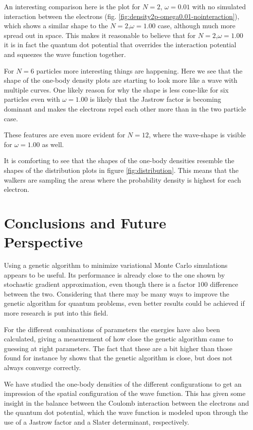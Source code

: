 \documentclass[aps,prb,twocolumn,floatfix]{revtex4}
\begin{document}
An interesting comparison here is the plot for $N=2$, $\omega=0.01$ with no simulated interaction between the electrons (fig. \ref{fig:density2p-omega0.01-nointeraction}), which shows a similar shape to the $N=2$,$\omega=1.00$ case, although much more spread out in space. This makes it reasonable to believe that for $N=2$,$\omega=1.00$ it is in fact the quantum dot potential that overrides the interaction potential and squeezes the wave function together.

For $N=6$ particles more interesting things are happening. Here we see that the shape of the one-body density plots are starting to look more like a wave with multiple curves. One likely reason for why the shape is less cone-like for six particles even with $\omega = 1.00$ is likely that the Jastrow factor is becoming dominant and makes the electrons repel each other more than in the two particle case.

These features are even more evident for $N=12$, where the wave-shape is visible for $\omega = 1.00$ as well.

It is comforting to see that the shapes of the one-body densities resemble the shapes of the distribution plots in figure \ref{fig:distribution}. This means that the walkers are sampling the areas where the probability density is highest for each electron.

\section{Conclusions and Future Perspective} \label{sec:conclusion}

Using a genetic algorithm to minimize variational Monte Carlo simulations appears to be useful. Its performance is already close to the one shown by stochastic gradient approximation, even though there is a factor $100$ difference between the two. Considering that there may be many ways to improve the genetic algorithm for quantum problems, even better results could be achieved if more research is put into this field.

For the different combinations of parameters the energies have also been calculated, giving a measurement of how close the genetic algorithm came to guessing at right parameters. The fact that these are a bit higher than those found for instance by \textcite{sigve} shows that the genetic algorithm is close, but does not always converge correctly.

We have studied the one-body densities of the different configurations to get an impression of the spatial configuration of the wave function. This has given some insight in the balance between the Coulomb interaction between the electrons and the quantum dot potential, which the wave function is modeled upon through the use of a Jastrow factor and a Slater determinant, respectively.
\end{document}
